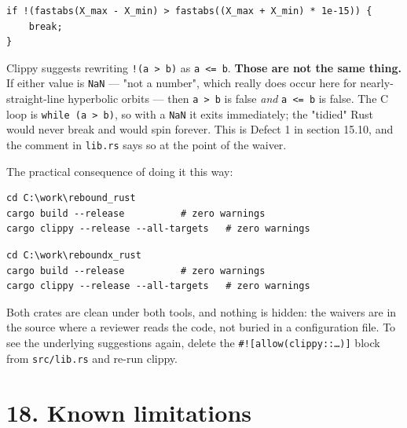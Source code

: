 \documentclass[11pt]{article}
\begin{document}
\begin{lstlisting}
if !(fastabs(X_max - X_min) > fastabs((X_max + X_min) * 1e-15)) {
    break;
}
\end{lstlisting}

Clippy suggests rewriting \texttt{!(a > b)} as \texttt{a <= b}. \textbf{Those are not the same thing.} If either value is \texttt{NaN} --- "not a number", which really does occur here for nearly-straight-line hyperbolic orbits --- then \texttt{a > b} is false \emph{and} \texttt{a <= b} is false. The C loop is \texttt{while (a > b)}, so with a \texttt{NaN} it exits immediately; the "tidied" Rust would never break and would spin forever. This is Defect 1 in section 15.10, and the comment in \texttt{lib.rs} says so at the point of the waiver.

The practical consequence of doing it this way:

\begin{lstlisting}
cd C:\work\rebound_rust
cargo build --release          # zero warnings
cargo clippy --release --all-targets   # zero warnings
\end{lstlisting}

\begin{lstlisting}
cd C:\work\reboundx_rust
cargo build --release          # zero warnings
cargo clippy --release --all-targets   # zero warnings
\end{lstlisting}

Both crates are clean under both tools, and nothing is hidden: the waivers are in the source where a reviewer reads the code, not buried in a configuration file. To see the underlying suggestions again, delete the \texttt{\#![allow(clippy::\ldots{})]} block from \texttt{src/lib.rs} and re-run clippy.

\section{18. Known limitations}
\end{document}

